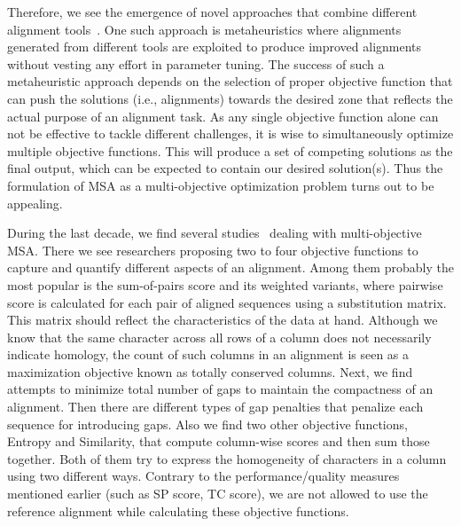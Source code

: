 Therefore, we see the emergence of novel approaches that combine different alignment tools~\citep{thompson2011comprehensive}. One such approach is metaheuristics where alignments generated from different tools are exploited to produce improved alignments without vesting any effort in parameter tuning. The success of such a metaheuristic approach depends on the selection of proper objective function that can push the solutions (i.e., alignments) towards the desired zone that reflects the actual purpose of an alignment task. As any single objective function alone can not be effective to tackle different challenges, it is wise to simultaneously optimize multiple objective functions. This will produce a set of competing solutions as the final output, which can be expected to contain our desired solution(s). Thus the formulation of MSA as a multi-objective optimization problem turns out to be appealing.

During the last decade, we find several studies~\citep{da2010alineaga, ortuno2013optimizing, soto2014multi, abbasi2015local, zhu2016novel, rani2016multiple, rubio2016hybrid,zambrano2017comparing} dealing with multi-objective MSA. There we see researchers proposing two to four objective functions to capture and quantify different aspects of an alignment. Among them probably the most popular is the sum-of-pairs score and its weighted variants, where pairwise score is calculated for each pair of aligned sequences using a substitution matrix. This matrix should reflect the characteristics of the data at hand. Although we know that the same character across all rows of a column does not necessarily indicate homology, the count of such columns in an alignment is seen as a maximization objective known as totally conserved columns. Next, we find attempts to minimize total number of gaps to maintain the compactness of an alignment. Then there are different types of gap penalties that penalize each sequence for introducing gaps. Also we find two other objective functions, Entropy and Similarity, that compute column-wise scores and then sum those together. Both of them try to express the homogeneity of characters in a column using two different ways. Contrary to the performance/quality measures mentioned earlier (such as SP score, TC score), we are not allowed to use the reference alignment while calculating these objective functions. 

